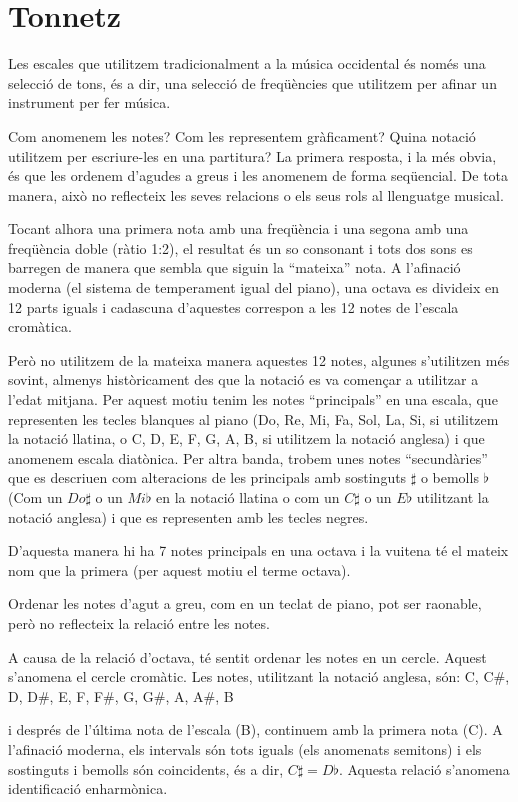 \section{Tonnetz}
Les escales que utilitzem tradicionalment a la música occidental és només una selecció de tons, és a dir, una selecció de freqüències que utilitzem per afinar un instrument per fer música.  

Com anomenem les notes? Com les representem gràficament? Quina notació utilitzem per escriure-les en una partitura? La primera resposta, i la més obvia, és que les ordenem d'agudes a greus i les anomenem de forma seqüencial. De tota manera, això no reflecteix les seves relacions o els seus rols al llenguatge musical.

Tocant alhora una primera nota amb una freqüència i una segona amb una freqüència doble (ràtio 1:2), el resultat és un so consonant i tots dos sons es barregen de manera que sembla que siguin la ``mateixa'' nota. A l'afinació moderna (el sistema de temperament igual del piano), una octava es divideix en 12 parts iguals i cadascuna d'aquestes correspon a les 12 notes de l'escala cromàtica. 

Però no utilitzem de la mateixa manera aquestes 12 notes, algunes s'utilitzen més sovint, almenys històricament des que la notació es va començar a utilitzar a l'edat mitjana. Per aquest motiu tenim les notes ``principals'' en una escala, que representen les tecles blanques al piano (Do, Re, Mi, Fa, Sol, La, Si, si utilitzem la notació llatina, o C, D, E, F, G, A, B, si utilitzem la notació anglesa) i que anomenem escala diatònica. Per altra banda, trobem unes notes ``secundàries'' que es descriuen com alteracions de les principals amb sostinguts $\sharp$ o bemolls $\flat$  (Com un $Do\sharp$ o un $Mi\flat$ en la notació llatina o com un $C\sharp$ o un $E\flat$ utilitzant la notació anglesa) i que es representen amb les tecles negres. 

D'aquesta manera hi ha 7 notes principals en una octava i la vuitena té el mateix nom que la primera (per aquest motiu el terme octava).

Ordenar les notes d'agut a greu, com en un teclat de piano, pot ser raonable, però no reflecteix la relació entre les notes.

A causa de la relació d'octava, té sentit ordenar  les notes en un cercle. Aquest s'anomena el cercle cromàtic. Les notes, utilitzant la notació anglesa, són:
C, C\#, D, D\#, E, F, F\#, G, G\#, A, A\#, B

i després de l'última nota de l'escala (B), continuem amb la primera nota (C). A l'afinació moderna, els intervals són tots iguals (els anomenats semitons) i els sostinguts i bemolls són coincidents, és a dir, $C\sharp = D\flat$. Aquesta relació s'anomena identificació enharmònica. 

